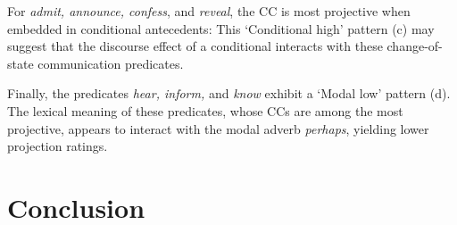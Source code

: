 \documentclass[a4paper,12pt,twoside]{article}
\begin{document}
	For \emph{admit, announce, confess}, and \emph{reveal}, the CC is most projective when embedded in conditional antecedents: This `Conditional high' pattern (c) may suggest that the discourse effect of a conditional interacts with these change-of-state communication predicates.
	
	Finally, the predicates \emph{hear, inform,} and \emph{know} exhibit a `Modal low' pattern (d). The lexical meaning of these predicates, whose CCs are among the most projective, appears to interact with the modal adverb {\em perhaps}, yielding lower projection ratings.

\section{Conclusion}




\end{document}
